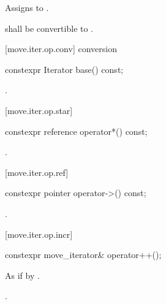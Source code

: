 \begin{itemdescr}
\pnum
\effects Assigns  to
.

\pnum
\requires {} shall be convertible to
.
\end{itemdescr}

[move.iter.op.conv]{ conversion}

%
\begin{itemdecl}
constexpr Iterator base() const;
\end{itemdecl}

\begin{itemdescr}
\pnum
\returns {}.
\end{itemdescr}

[move.iter.op.star]{}

%
\begin{itemdecl}
constexpr reference operator*() const;
\end{itemdecl}

\begin{itemdescr}
\pnum
\returns {}.
\end{itemdescr}

[move.iter.op.ref]{}


%
\begin{itemdecl}
constexpr pointer operator->() const;
\end{itemdecl}

\begin{itemdescr}
\pnum
\returns {}.
\end{itemdescr}

[move.iter.op.incr]{}

%
\begin{itemdecl}
constexpr move_iterator& operator++();
\end{itemdecl}

\begin{itemdescr}
\pnum
\effects As if by .

\pnum
\returns {}.
\end{itemdescr}

